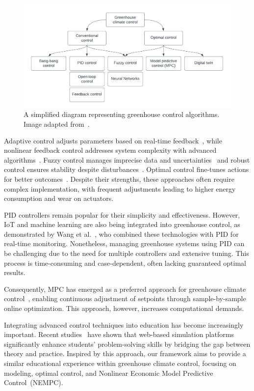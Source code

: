 \documentclass[conference]{IEEEtran}
\begin{document}
\begin{figure}
    \centering
    \includegraphics[width=.5\textwidth]{images/flowchart.pdf}
    \caption{A simplified diagram representing greenhouse control algorithms. Image adapted from~\cite{Trepanier2024}.}\label{fig:flowchart}
\end{figure}

Adaptive control adjusts parameters based on real-time feedback~\cite{Tian2022}, while nonlinear feedback control addresses system complexity with advanced algorithms~\cite{Bood2023}. Fuzzy control manages imprecise data and uncertainties~\cite{smartcities7030055} and robust control ensures stability despite disturbances~\cite{Zhang2021}. Optimal control fine-tunes actions for better outcomes~\cite{Debroy2024, SVENSEN2024108578}. Despite their strengths, these approaches often require complex implementation, with frequent adjustments leading to higher energy consumption and wear on actuators.

PID controllers remain popular for their simplicity and effectiveness. However, IoT and machine learning are also being integrated into greenhouse control, as demonstrated by Wang et al.~\cite{Wang2024}, who combined these technologies with PID for real-time monitoring. Nonetheless, managing greenhouse systems using PID can be challenging due to the need for multiple controllers and extensive tuning. This process is time-consuming and case-dependent, often lacking guaranteed optimal results.

Consequently, MPC has emerged as a preferred approach for greenhouse climate control~\cite{Hu2022}, enabling continuous adjustment of setpoints through sample-by-sample online optimization. This approach, however, increases computational demands.

Integrating advanced control techniques into education has become increasingly important. Recent studies~\cite{WangEducation2024, Zakova2024} have shown that web-based simulation platforms significantly enhance students' problem-solving skills by bridging the gap between theory and practice. Inspired by this approach, our framework aims to provide a similar educational experience within greenhouse climate control, focusing on modeling, optimal control, and Nonlinear Economic Model Predictive Control~(NEMPC).
\end{document}
